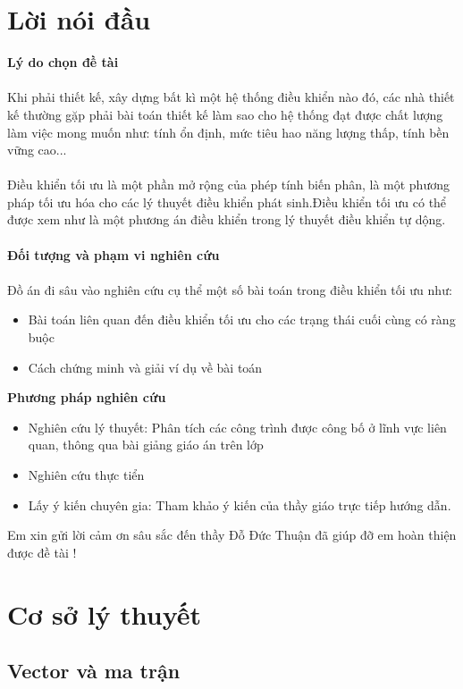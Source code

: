 \documentclass[12pt,a4paper]{report}
\begin{document}
	\chapter*{Lời nói đầu}
	\setcounter{page}{1}
	\textbf{Lý do chọn đề tài}\\\\
	Khi phải thiết kế, xây dựng bất kì một hệ thống điều khiển nào đó, các nhà thiết kế thường gặp phải bài toán thiết kế làm sao cho hệ thống đạt được chất lượng làm việc mong muốn như: tính ổn định, mức tiêu hao năng lượng thấp, tính bền vững cao...\\\\ Điều khiển tối ưu là một phần mở rộng của phép tính biến phân, là một phương pháp tối ưu hóa cho các lý thuyết điều khiển phát sinh.Điều khiển tối ưu có thể được xem như là một phương án điều khiển trong lý thuyết điều khiển tự dộng.\\\\
	\textbf{Đối tượng và phạm vi nghiên cứu} \\\\
	Đồ án đi sâu vào nghiên cứu cụ thể một số bài toán trong điều khiển tối ưu như:
	\begin{itemize}
		\item Bài toán liên quan đến điều khiển tối ưu cho các trạng thái cuối cùng có ràng buộc
		\item Cách chứng minh và giải ví dụ về bài toán
	\end{itemize}
	\textbf{Phương pháp nghiên cứu}
	\begin{itemize}
		\item Nghiên cứu lý thuyết: Phân tích các công trình được công bố ở lĩnh vực liên quan, thông qua bài giảng giáo án trên lớp
		\item Nghiên cứu thực tiển
		\item Lấy ý kiến chuyên gia: Tham khảo ý kiến của thầy giáo trực tiếp hướng dẫn.
	\end{itemize}
	Em xin gửi lời cảm ơn sâu sắc đến thầy Đỗ Đức Thuận đã giúp đỡ em hoàn thiện được đề tài !
	
	\tableofcontents
	
	\chapter{Cơ sở lý thuyết}
	\section{Vector và ma trận}
\end{document}
